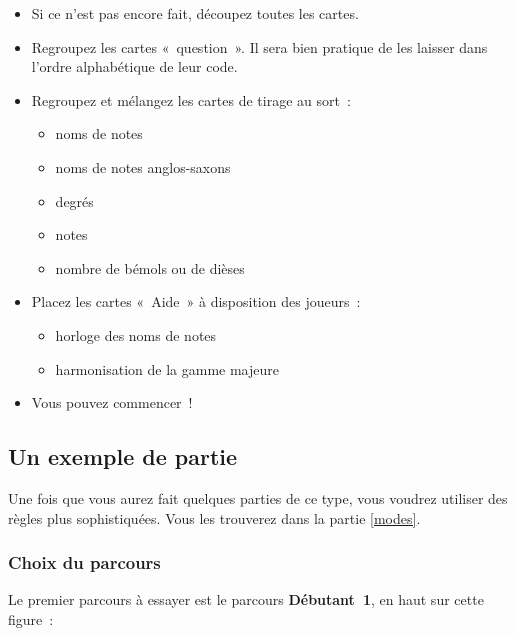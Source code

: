 \documentclass[11pt]{article}
\newcommand{\parcours}[1]
{\textbf{#1}}
\begin{document}
\begin{itemize}
\item Si ce n’est pas encore fait, découpez toutes les cartes.
\item Regroupez les cartes « question ». Il sera bien pratique de les laisser
    dans l’ordre alphabétique de leur code.
\item Regroupez et mélangez les cartes de tirage au sort :
    \begin{itemize}
    \item noms de notes
    \item noms de notes anglos-saxons
    \item degrés
    \item notes
    \item nombre de bémols ou de dièses
    \end{itemize}
\item Placez les cartes « Aide » à disposition des joueurs :
    \begin{itemize}
    \item horloge des noms de notes
    \item harmonisation de la gamme majeure
    \end{itemize}
\item Vous pouvez commencer !
\end{itemize}

\subsection{Un exemple de partie}

Une fois que vous aurez fait quelques parties de ce type, vous voudrez utiliser
des règles plus sophistiquées. Vous les trouverez dans la partie \ref{modes}.

\subsubsection{Choix du parcours}

Le premier parcours à essayer est le parcours \parcours{Débutant 1}, en haut
sur cette figure :

\end{document}
